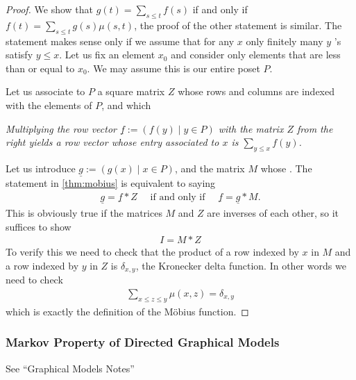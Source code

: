 \documentclass{article}
\begin{document}
\begin{proof}
We show that $g(t)=\sum_{s \leq t} f(s)$ if and only if $f(t)=\sum_{s \leq t} g(s) \mu(s, t)$, the proof of the other statement is similar. The statement makes sense only if we assume that for any $x$ only finitely many $y$ 's satisfy $y \leq x$. Let us fix an element $x_{0}$ and consider only elements that are less than or equal to $x_{0}$. We may assume this is our entire poset $P$. 

Let us associate to $P$ a square matrix $Z$ whose rows and columns are indexed with the elements of $P$, and which  

\emph{Multiplying the row vector $\underline{f}:=(f(y) \mid y \in P)$ with the matrix $Z$ from the right yields a row vector whose entry associated to $x$ is $\sum_{y \leq x} f(y)$.}

Let us introduce $\underline{g}:=(g(x) \mid x \in P)$, and the matrix $M$ whose . The  statement in \cref{thm:mobius} is equivalent to saying
\begin{align*}
\underline{g}=\underline{f} \ast Z \quad \text { if and only if } \quad \underline{f}=\underline{g} \ast M .
\end{align*}
This is obviously true if the matrices $M$ and $Z$ are inverses of each other, so it suffices to show
\begin{align*}
I=M \ast Z
\end{align*}
To verify this we need to check that the product of a row indexed by $x$ in $M$ and a row indexed by $y$ in $Z$ is $\delta_{x, y}$, the Kronecker delta function. In other words we need to check
\begin{align*}
\sum_{x \leq z \leq y} \mu(x, z)=\delta_{x, y}
\end{align*}
which is exactly the definition of the Möbius function.
\end{proof}
\subsubsection{Markov Property of Directed Graphical Models}
See ``Graphical Models Notes''





\end{document}
